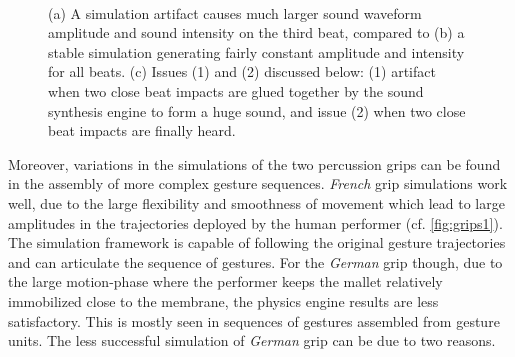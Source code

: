 \begin{figure}[H]
	\begin{center}
		\hspace{6mm}
		\\
	\end{center}
	\vspace{-0.5cm}
	\caption[Instrumental gesture simulation: artifacts and their influence on sound synthesis]{(a) A simulation artifact causes much larger sound waveform amplitude and sound intensity on the third beat, compared to (b) a stable simulation generating fairly constant amplitude and intensity for all beats. (c) Issues (1) and (2) discussed below: (1) artifact when two close beat impacts are glued together by the sound synthesis engine to form a huge sound, and issue (2) when two close beat impacts are finally heard.}
	\label{fig:soundComparison}
\end{figure}

Moreover, variations in the simulations of the two percussion grips can be found in the assembly of more complex gesture sequences. \emph{French} grip simulations work well, due to the large flexibility and smoothness of movement which lead to large amplitudes in the trajectories deployed by the human performer (cf. \myfigname \ref{fig:grips1}). The simulation framework is capable of following the original gesture trajectories and can articulate the sequence of gestures. For the \emph{German} grip though, due to the large motion-phase where the performer keeps the mallet relatively immobilized close to the membrane, the physics engine results are less satisfactory. This is mostly seen in sequences of gestures assembled from gesture units. The less successful simulation of \emph{German} grip can be due to two reasons.

